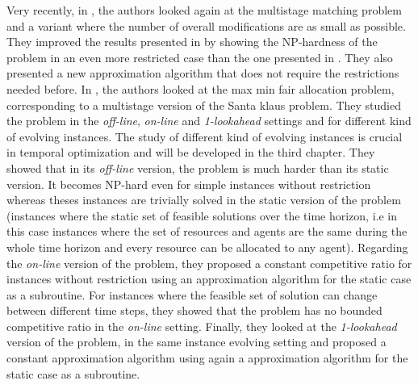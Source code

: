 \documentclass[a4paper]{book}
\begin{document}
Very recently, in \cite{chimani2020approximating}, the authors looked again at the {\sc multistage matching} problem and a variant where the number of overall modifications are as small as possible. They improved the results presented in \cite{bampis2018multistage} by showing the NP-hardness of the problem in an even more restricted case than the one presented in \cite{bampis2018multistage}. They also presented a new approximation algorithm that does not require the restrictions needed before.
In \cite{bampis2018fair}, the authors looked at the {\sc max min fair allocation} problem, corresponding to a multistage version of the {\sc Santa klaus} problem. They studied the problem in the \emph{off-line}, \emph{on-line} and \emph{1-lookahead} settings and for different kind of evolving instances. The study of different kind of evolving instances is crucial in temporal optimization and will be developed in the third chapter. They showed that in its \emph{off-line} version, the problem is much harder than its static version. It becomes NP-hard even for simple instances without restriction whereas theses instances are trivially solved in the static version of the problem (instances where the static set of feasible solutions over the time horizon, i.e in this case instances where the set of resources and agents are the same during the whole time horizon and every resource can be allocated to any agent). Regarding the \emph{on-line} version of the problem, they proposed a constant competitive ratio for instances without restriction using an approximation algorithm for the static case as a subroutine. For instances where the feasible set of solution can change between different time steps, they showed that the problem has no bounded competitive ratio in the \emph{on-line} setting. Finally, they looked at the \emph{1-lookahead} version of the problem, in the same instance evolving setting and proposed a constant approximation algorithm using again a approximation algorithm for the static case as a subroutine. \\
\end{document}
